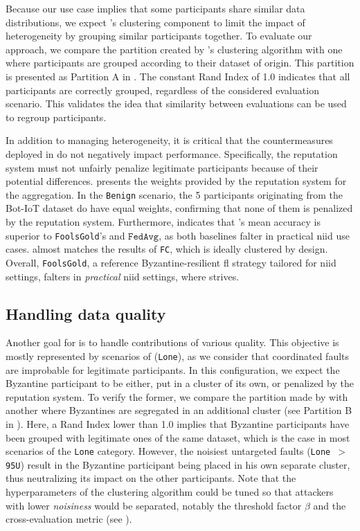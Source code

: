 Because our use case implies that some participants share similar data distributions, we expect \thecontrib's clustering component to limit the impact of heterogeneity by grouping similar participants together.
To evaluate our approach, we compare the partition created by \thecontrib's clustering algorithm with one where participants are grouped according to their dataset of origin.
This partition is presented as Partition A in .
The constant Rand Index of 1.0 indicates that all participants are correctly grouped, regardless of the considered evaluation scenario.
This validates the idea that similarity between evaluations can be used to regroup participants. 

In addition to managing heterogeneity, it is critical that the countermeasures deployed in \thecontrib do not negatively impact performance.
Specifically, the reputation system must not unfairly penalize legitimate participants because of their potential differences.
 presents the weights provided by the reputation system for the aggregation. 
In the \texttt{Benign} scenario, the 5 participants originating from the Bot-IoT dataset do have equal weights, confirming that none of them is penalized by the reputation system.
Furthermore,  indicates that \thecontrib's mean accuracy is superior to \texttt{FoolsGold}'s and $\texttt{FedAvg}$, as both baselines falter in practical \gls{niid} use cases.
\thecontrib almost matches the results of \texttt{FC}, which is ideally clustered by design.
Overall, \texttt{FoolsGold}, a reference Byzantine-resilient \gls{fl} strategy tailored for \gls{niid} settings, falters in \emph{practical} \gls{niid} settings, where \thecontrib strives.


\subsection{Handling data quality\label{sec:radar.eval.results.quality}}

Another goal for \thecontrib is to handle contributions of various quality.
This objective is mostly represented by scenarios of  (\texttt{Lone}), as we consider that coordinated faults are improbable for legitimate participants.
In this configuration, we expect the Byzantine participant to be either, put in a cluster of its own, or penalized by the reputation system.
To verify the former, we compare the partition made by \thecontrib with another where Byzantines are segregated in an additional cluster (see Partition B in ).
Here, a Rand Index lower than 1.0 implies that Byzantine participants have been grouped with legitimate ones of the same dataset, which is the case in most scenarios of the \texttt{Lone} category.
However, the noisiest untargeted faults (\texttt{Lone~$>$95U}) result in the Byzantine participant being placed in his own separate cluster, thus neutralizing its impact on the other participants.
Note that the hyperparameters of the clustering algorithm could be tuned so that attackers with lower \emph{noisiness} would be separated, notably the threshold factor $\beta$ and the cross-evaluation metric (see ).

